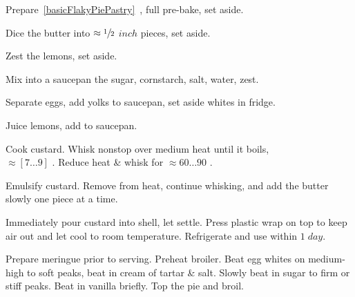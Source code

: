 \begin{preparation}
\item Prepare~\ref{basicFlakyPiePastry}~, full
    pre-bake, set aside.

\item Dice the butter into $\approx\sfrac{1}{2}$ $inch$ pieces, set aside.

\item Zest the lemons, set aside.

\item Mix into a saucepan the sugar, cornstarch, salt, water, zest.

\item Separate eggs, add yolks to saucepan, set aside whites in fridge.

\item Juice lemons, add to saucepan.

\item Cook custard.
    Whisk nonstop over medium heat until it boils,\\ $\approx[7\dots9]$ \minute.
    Reduce heat \& whisk for $\approx 60 \dots 90$ \second.

\item Emulsify custard.
    Remove from heat, continue whisking, and add the butter slowly one piece at a time.

\item Immediately pour custard into shell, let settle.
    Press plastic wrap on top to keep air out and let cool to room temperature.
    Refrigerate and use within $1\; day$.

\item Prepare meringue prior to serving.
    Preheat broiler.
    Beat egg whites on medium-high to soft peaks, beat in cream of tartar \& salt.
    Slowly beat in sugar to firm or stiff peaks.
    Beat in vanilla briefly. Top the pie and broil.
\end{preparation}

\recipeend%
